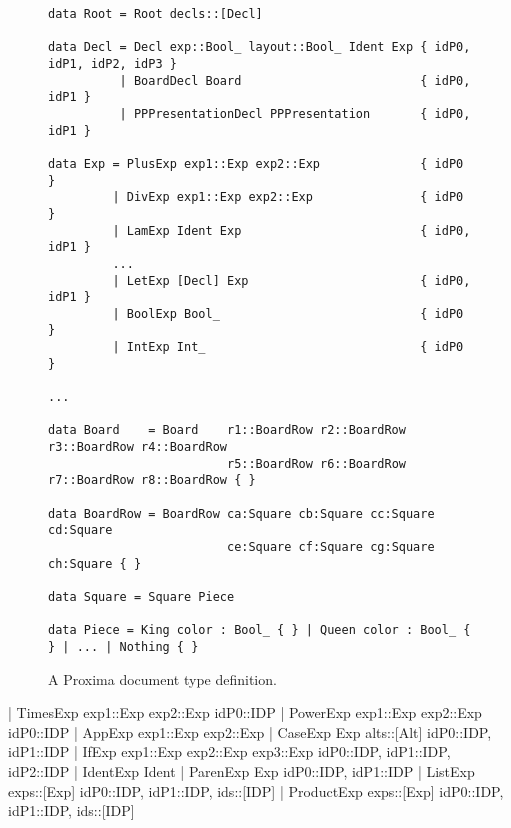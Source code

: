 \begin{figure}
\begin{small}
\begin{center}
\begin{footnotesize}
\begin{verbatim}
data Root = Root decls::[Decl]

data Decl = Decl exp::Bool_ layout::Bool_ Ident Exp { idP0, idP1, idP2, idP3 }
          | BoardDecl Board                         { idP0, idP1 }
          | PPPresentationDecl PPPresentation       { idP0, idP1 }

data Exp = PlusExp exp1::Exp exp2::Exp              { idP0 }
         | DivExp exp1::Exp exp2::Exp               { idP0 }
         | LamExp Ident Exp                         { idP0, idP1 }
         ...
         | LetExp [Decl] Exp                        { idP0, idP1 }
         | BoolExp Bool_                            { idP0 }
         | IntExp Int_                              { idP0 }

...

data Board    = Board    r1::BoardRow r2::BoardRow r3::BoardRow r4::BoardRow
                         r5::BoardRow r6::BoardRow r7::BoardRow r8::BoardRow { }

data BoardRow = BoardRow ca:Square cb:Square cc:Square cd:Square
                         ce:Square cf:Square cg:Square ch:Square { }

data Square = Square Piece

data Piece = King color : Bool_ { } | Queen color : Bool_ { } | ... | Nothing { }
\end{verbatim}
\end{footnotesize}
\caption{A Proxima document type definition.}\label{docTypeExample} 
\end{center}
\end{small}
\end{figure}

\bc
         | TimesExp  exp1::Exp exp2::Exp                     { idP0::IDP }
         | PowerExp exp1::Exp exp2::Exp                      { idP0::IDP }
         | AppExp exp1::Exp exp2::Exp                        { }
         | CaseExp Exp alts::[Alt]                          { idP0::IDP, idP1::IDP }
         | IfExp exp1::Exp exp2::Exp exp3::Exp                { idP0::IDP, idP1::IDP, idP2::IDP }
         | IdentExp Ident                                  { }
         | ParenExp Exp                                    { idP0::IDP, idP1::IDP }
         | ListExp exps::[Exp]                              { idP0::IDP, idP1::IDP, ids::[IDP] }
         | ProductExp exps::[Exp]                           { idP0::IDP, idP1::IDP, ids::[IDP] }

